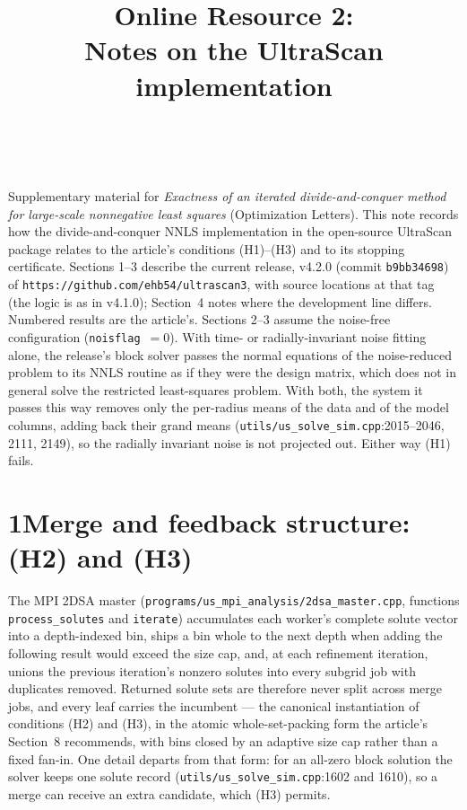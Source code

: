 \documentclass[pdflatex,sn-mathphys-num]{sn-jnl}
\begin{document}
\title[Online Resource 2]{Online Resource 2:\\ Notes on the UltraScan
implementation}

\author*[1]{
\,}%


\maketitle

\noindent
Supplementary material for \emph{Exactness of an iterated
divide-and-conquer method for large-scale nonnegative least squares}
(Optimization Letters). This note records how the divide-and-conquer
NNLS implementation in the open-source UltraScan package relates to
the article's conditions (H1)--(H3) and to its stopping certificate.
Sections 1--3 describe the current release, v4.2.0 (commit
\texttt{b9bb34698}) of \texttt{https://github.com/ehb54/ultrascan3},
with source locations at that tag (the logic is as in v4.1.0);
Section~4 notes where the development line differs. Numbered results
are the article's. Sections 2--3 assume the noise-free configuration
(\texttt{noisflag}~$=0$). With time- or radially-invariant noise
fitting alone, the release's block solver passes the normal equations
of the noise-reduced problem to its NNLS routine as if they were the
design matrix, which does not in general solve the restricted
least-squares problem. With both, the system it passes this way
removes only the per-radius means of the data and of the model
columns, adding back their grand means
(\texttt{utils/us\_solve\_sim.cpp}:2015--2046, 2111, 2149), so the
radially invariant noise is not projected out. Either way (H1) fails.

\section*{1\quad Merge and feedback structure: (H2) and (H3)}

The MPI 2DSA master
(\texttt{programs/us\_mpi\_analysis/2dsa\_master.cpp}, functions
\texttt{process\_solutes} and \texttt{iterate}) accumulates each
worker's complete solute vector into a depth-indexed bin, ships a bin
whole to the next depth when adding the following result would exceed
the size cap, and, at each refinement iteration, unions the previous
iteration's nonzero solutes into every subgrid job with duplicates
removed. Returned solute sets are therefore never split across merge
jobs, and every leaf carries the incumbent --- the canonical
instantiation of conditions (H2) and (H3), in the atomic
whole-set-packing form the article's Section~8 recommends, with bins
closed by an adaptive size cap rather than a fixed fan-in. One detail
departs from that form: for an all-zero block solution the solver keeps
one solute record (\texttt{utils/us\_solve\_sim.cpp}:1602 and 1610), so
a merge can receive an extra candidate, which (H3) permits.
\end{document}
